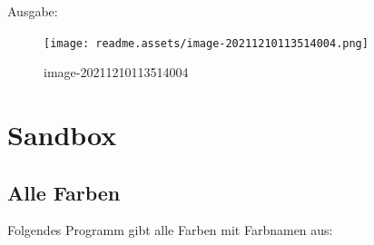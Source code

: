 \documentclass[
  oneside]{book}
\begin{document}
Ausgabe:

\begin{figure}
\centering
\texttt{[image: readme.assets/image-20211210113514004.png]}
\caption{image-20211210113514004}
\end{figure}

\hypertarget{sandbox}{%
\chapter{Sandbox}\label{sandbox}}

\hypertarget{alle-farben}{%
\section{Alle Farben}\label{alle-farben}}

Folgendes Programm gibt alle Farben mit Farbnamen aus:
\end{document}
